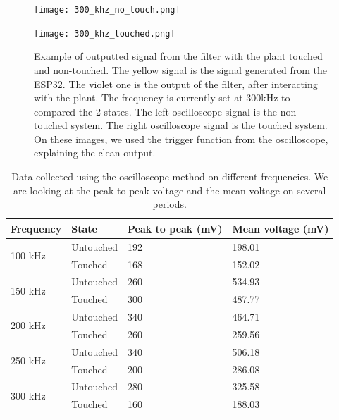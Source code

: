 \begin{figure}[h!]
    \centering
    \begin{minipage}{.5\textwidth}
      \centering
      \texttt{[image: 300\_khz\_no\_touch.png]}
      \label{fig:300_khz_no_touch}
    \end{minipage}%
    \begin{minipage}{.5\textwidth}
      \centering
      \texttt{[image: 300\_khz\_touched.png]}
      \label{fig:300_khz_touched}
    \end{minipage}
    \caption{Example of outputted signal from the filter with the plant touched and non-touched. The yellow signal is the signal generated from the ESP32. The violet one is the output of the filter, after interacting with the plant. The frequency is currently set at 300kHz to compared the 2 states. The left oscilloscope signal is the non-touched system. The right oscilloscope signal is the touched system. On these images, we used the trigger function from the oscilloscope, explaining the clean output.}
    \label{fig:300_khz_signals}
\end{figure}


\begin{table}[h!]
    \begin{tabular}{|l|lll|}
    \hline
    Frequency                & State     & Peak to peak (mV) & Mean voltage (mV) \\ \hline
    \multirow{2}{*}{100 kHz} & Untouched & 192               & 198.01            \\
                             & Touched   & 168               & 152.02            \\ \hline
    \multirow{2}{*}{150 kHz} & Untouched & 260               & 534.93            \\
                             & Touched   & 300               & 487.77            \\ \hline
    \multirow{2}{*}{200 kHz} & Untouched & 340               & 464.71            \\
                             & Touched   & 260               & 259.56            \\ \hline
    \multirow{2}{*}{250 kHz} & Untouched & 340               & 506.18            \\
                             & Touched   & 200               & 286.08            \\ \hline
    \multirow{2}{*}{300 kHz} & Untouched & 280               & 325.58            \\
                             & Touched   & 160               & 188.03            \\ \hline
    \end{tabular}
    \caption{Data collected using the oscilloscope method on different frequencies. We are looking at the peak to peak voltage and the mean voltage on several periods.}
    \label{tab:sum_up_data_oscil}
    \end{table}

